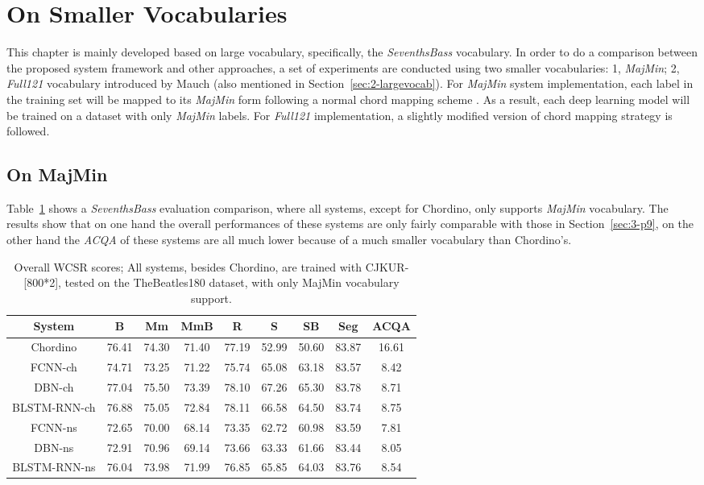 \section{On Smaller Vocabularies}
This chapter is mainly developed based on large vocabulary, specifically, the \textit{SeventhsBass} vocabulary. In order to do a comparison between the proposed system framework and other approaches, a set of experiments are conducted using two smaller vocabularies: 1, \textit{MajMin}; 2, \textit{Full121} vocabulary introduced by Mauch \cite{mauch2010automatic} (also mentioned in Section~\ref{sec:2-largevocab}). For \textit{MajMin} system implementation, each label in the training set will be mapped to its \textit{MajMin} form following a normal chord mapping scheme \cite{harte2010towards,pauwels2013evaluating}. As a result, each deep learning model will be trained on a dataset with only \textit{MajMin} labels. For \textit{Full121} implementation, a slightly modified version of chord mapping strategy \cite{mauch2010automatic} is followed.

\subsection{On MajMin}
Table~\ref{tab:3-overallres} shows a \textit{SeventhsBass} evaluation comparison, where all systems, except for Chordino, only supports \textit{MajMin} vocabulary. The results show that on one hand the overall performances of these systems are only fairly comparable with those in Section~\ref{sec:3-p9}, on the other hand the \textit{ACQA} of these systems are all much lower because of a much smaller vocabulary than Chordino's.
\begin{table}[h]
\footnotesize
\centering
\caption{Overall WCSR scores; All systems, besides Chordino, are trained with CJKUR-[800*2], tested on the TheBeatles180 dataset, with only MajMin vocabulary support.}
\label{tab:3-overallres}
\begin{tabular}{|c|c|c|c|c|c|c|c|c|}\hline
System & B & Mm & MmB & R & S & SB & Seg & ACQA \\ \hline
Chordino & 76.41 & 74.30 & 71.40 & 77.19 & 52.99 & 50.60 & 83.87 & 16.61\\ \hline
FCNN-ch & 74.71 & 73.25 & 71.22 & 75.74 & 65.08 & 63.18 & 83.57 & 8.42\\ \hline
DBN-ch & 77.04 & 75.50 & 73.39 & 78.10 & 67.26 & 65.30 & 83.78 & 8.71\\ \hline
BLSTM-RNN-ch & 76.88 & 75.05 & 72.84 & 78.11 & 66.58 & 64.50 & 83.74 & 8.75\\ \hline
FCNN-ns & 72.65 & 70.00 & 68.14 & 73.35 & 62.72 & 60.98 & 83.59 & 7.81\\ \hline
DBN-ns & 72.91 & 70.96 & 69.14 & 73.66 & 63.33 & 61.66 & 83.44 & 8.05\\ \hline
BLSTM-RNN-ns & 76.04 & 73.98 & 71.99 & 76.85 & 65.85 & 64.03 & 83.76 & 8.54\\ \hline
\end{tabular}
\end{table}

